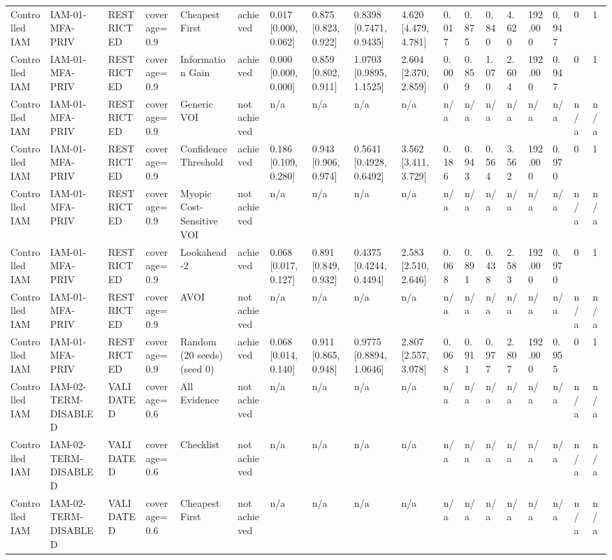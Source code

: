 \begin{table}[!ht]
{\begin{tabular}{llllllllllllllllll}
Controlled IAM & IAM-01-MFA-PRIV & RESTRICTED & coverage=0.9 & Cheapest First & achieved & 0.017 [0.000, 0.062] & 0.875 [0.823, 0.922] & 0.8398 [0.7471, 0.9435] & 4.620 [4.479, 4.781] & 0.017 & 0.875 & 0.840 & 4.620 & 192.000 & 0.947 & 0 & 1 \\
Controlled IAM & IAM-01-MFA-PRIV & RESTRICTED & coverage=0.9 & Information Gain & achieved & 0.000 [0.000, 0.000] & 0.859 [0.802, 0.911] & 1.0703 [0.9895, 1.1525] & 2.604 [2.370, 2.859] & 0.000 & 0.859 & 1.070 & 2.604 & 192.000 & 0.947 & 0 & 1 \\
Controlled IAM & IAM-01-MFA-PRIV & RESTRICTED & coverage=0.9 & Generic VOI & not achieved & n/a & n/a & n/a & n/a & n/a & n/a & n/a & n/a & n/a & n/a & n/a & n/a \\
Controlled IAM & IAM-01-MFA-PRIV & RESTRICTED & coverage=0.9 & Confidence Threshold & achieved & 0.186 [0.109, 0.280] & 0.943 [0.906, 0.974] & 0.5641 [0.4928, 0.6492] & 3.562 [3.411, 3.729] & 0.186 & 0.943 & 0.564 & 3.562 & 192.000 & 0.970 & 0 & 1 \\
Controlled IAM & IAM-01-MFA-PRIV & RESTRICTED & coverage=0.9 & Myopic Cost-Sensitive VOI & not achieved & n/a & n/a & n/a & n/a & n/a & n/a & n/a & n/a & n/a & n/a & n/a & n/a \\
Controlled IAM & IAM-01-MFA-PRIV & RESTRICTED & coverage=0.9 & Lookahead-2 & achieved & 0.068 [0.017, 0.127] & 0.891 [0.849, 0.932] & 0.4375 [0.4244, 0.4494] & 2.583 [2.510, 2.646] & 0.068 & 0.891 & 0.438 & 2.583 & 192.000 & 0.970 & 0 & 1 \\
Controlled IAM & IAM-01-MFA-PRIV & RESTRICTED & coverage=0.9 & AVOI & not achieved & n/a & n/a & n/a & n/a & n/a & n/a & n/a & n/a & n/a & n/a & n/a & n/a \\
Controlled IAM & IAM-01-MFA-PRIV & RESTRICTED & coverage=0.9 & Random (20 seeds) (seed 0) & achieved & 0.068 [0.014, 0.140] & 0.911 [0.865, 0.948] & 0.9775 [0.8894, 1.0646] & 2.807 [2.557, 3.078] & 0.068 & 0.911 & 0.977 & 2.807 & 192.000 & 0.955 & 0 & 1 \\
Controlled IAM & IAM-02-TERM-DISABLED & VALIDATED & coverage=0.6 & All Evidence & not achieved & n/a & n/a & n/a & n/a & n/a & n/a & n/a & n/a & n/a & n/a & n/a & n/a \\
Controlled IAM & IAM-02-TERM-DISABLED & VALIDATED & coverage=0.6 & Checklist & not achieved & n/a & n/a & n/a & n/a & n/a & n/a & n/a & n/a & n/a & n/a & n/a & n/a \\
Controlled IAM & IAM-02-TERM-DISABLED & VALIDATED & coverage=0.6 & Cheapest First & not achieved & n/a & n/a & n/a & n/a & n/a & n/a & n/a & n/a & n/a & n/a & n/a & n/a \\

\end{tabular}}
\end{table}

